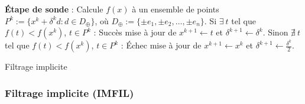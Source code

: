 \documentclass{beamer}
\newcommand\tab[1][1cm]{\hspace*{#1}}
\newcommand{\IMFIL}{\textsf{IMFIL}}
\begin{document}
\begin{frame}
\begin{algorithm}[H]
\begin{algorithmic}[]
\STATE \textbf{Étape de sonde} : Calcule $f(x)$ à un ensemble de points
\STATE $P^k:=\{x^k+\delta ^k d:d\in D_{\oplus}\}$, où $D_{\oplus} := \{\pm e_1,\pm e_2,\dots,\pm e_n\}$.
\STATE
\STATE Si $\exists~t$ tel que $f(t) < f(x^k)$, $t\in P^k$ : Succès
\STATE \tab mise à jour de $x^{k+1}\leftarrow t$ et $\delta^{k+1} \leftarrow \delta^k$.
\STATE
\STATE Sinon $\nexists~t$ tel que $f(t) < f(x^k)$, $t\in P^k$ : Échec
\STATE \tab mise à jour de $x^{k+1}\leftarrow x^k$ et $\delta^{k+1} \leftarrow \frac{\delta^k}{2}$.
\ENDFOR
\end{algorithmic}
\caption{Filtrage implicite}
\label{alg:imfil}
\end{algorithm}
\frametitle{Filtrage implicite (\IMFIL)}
\end{frame}
\end{document}
